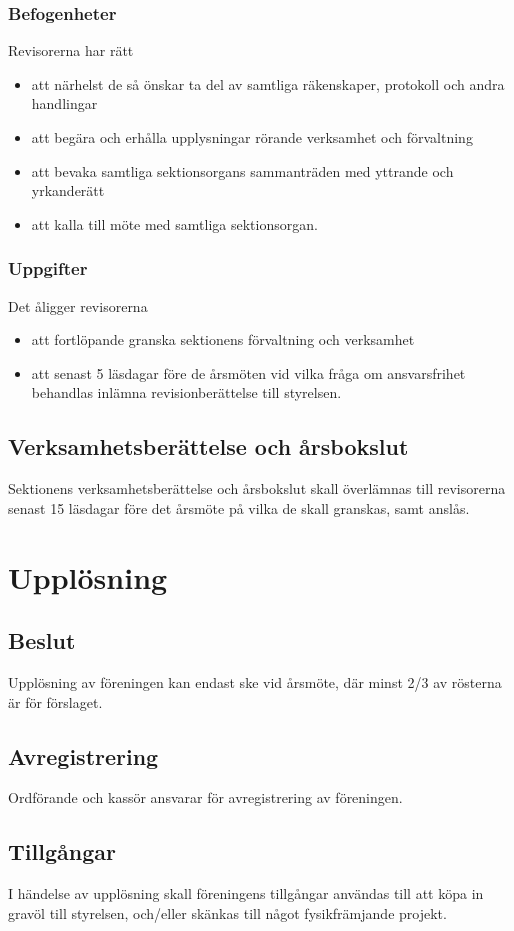 \documentclass{dgovdoc}
\begin{document}
\subsubsection{Befogenheter}

Revisorerna har rätt

\begin{itemize}
  \item att närhelst de så önskar ta del av samtliga räkenskaper, protokoll och
    andra handlingar
  \item att begära och erhålla upplysningar rörande verksamhet och förvaltning
  \item att bevaka samtliga sektionsorgans sammanträden med yttrande och
    yrkanderätt
  \item att kalla till möte med samtliga sektionsorgan.
\end{itemize}

\subsubsection{Uppgifter}

Det åligger revisorerna

\begin{itemize}
  \item att fortlöpande granska sektionens förvaltning och verksamhet
  \item att senast 5 läsdagar före de årsmöten vid vilka fråga om ansvarsfrihet
    behandlas inlämna revisionberättelse
    till styrelsen.
\end{itemize}

\subsection{Verksamhetsberättelse och årsbokslut}

Sektionens verksamhetsberättelse och årsbokslut skall överlämnas till
revisorerna senast 15 läsdagar före det årsmöte på vilka de skall granskas, samt
anslås.

\section{Upplösning}

\subsection{Beslut}

Upplösning av föreningen kan endast ske vid årsmöte, där minst 2/3 av rösterna är för förslaget.

\subsection{Avregistrering}

Ordförande och kassör ansvarar för avregistrering av föreningen.

\subsection{Tillgångar}

I händelse av upplösning skall föreningens tillgångar användas till att köpa in gravöl till styrelsen, och/eller skänkas till något fysikfrämjande projekt.
\end{document}
